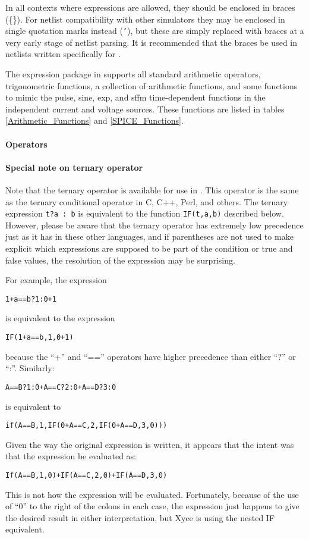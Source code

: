In all contexts where expressions are allowed, they should be enclosed
in braces (\{\}).  For netlist compatibility with other simulators
they may be enclosed in single quotation marks instead (\texttt{'}),
but these are simply replaced with braces at a very early stage of
netlist parsing.  It is recommended that the braces be used in
netlists written specifically for \Xyce{}.

The expression package in \Xyce{} supports all standard arithmetic
operators, trigonometric functions, a collection of arithmetic
functions, and some functions to mimic the pulse, sine, exp, and sffm
time-dependent functions in the independent current and voltage sources.
These functions are listed in tables \ref{Arithmetic_Functions} and
\ref{SPICE_Functions}.

\paragraph{Operators}


\paragraph{Special note on ternary operator}
Note that the ternary operator is available for use in \Xyce{}.  This
operator is the same as the ternary conditional operator in C, C++,
Perl, and others.  The ternary expression \texttt{t?a : b} is
equivalent to the function \texttt{IF(t,a,b)} described below.
However, please be aware that the ternary operator has extremely low
precedence just as it has in these other languages, and if parentheses
are not used to make explicit which expressions are supposed to be
part of the condition or true and false values, the resolution of the
expression may be surprising.

For example, the expression
\begin{alltt}
  1+a==b?1:0+1
\end{alltt}
is equivalent to the expression
\begin{alltt}
  IF(1+a==b,1,0+1)
\end{alltt}
because the ``+'' and ``=='' operators have higher precedence than
either ``?'' or ``:''.  Similarly:
\begin{alltt}
  A==B?1:0 + A==C?2:0 + A==D?3:0
\end{alltt}
is equivalent to
\begin{alltt}
  if(A==B,1,IF(0 + A==C,2,IF(0 + A==D,3,0)))
\end{alltt}
Given the way the original expression is written, it appears that the
intent was that the expression be evaluated as:
\begin{alltt}
  If(A==B,1,0) + IF(A==C,2,0) + IF(A==D,3,0)
\end{alltt}
This is not how the expression will be evaluated.  Fortunately,
because of the use of ``0'' to the right of the colons in each case,
the expression just happens to give the desired result in either
interpretation, but Xyce is using the nested IF equivalent.

